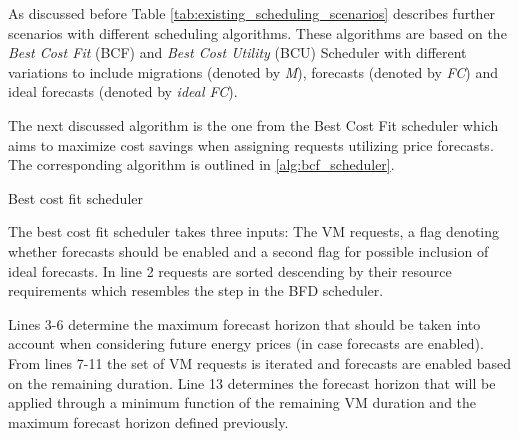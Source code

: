 As discussed before Table \ref{tab:existing_scheduling_scenarios} describes further scenarios with different scheduling algorithms. 
These algorithms are based on the \textit{Best Cost Fit} (BCF) and \textit{Best Cost Utility} (BCU) Scheduler with different variations to include migrations (denoted by \textit{M}), forecasts (denoted by \textit{FC}) and ideal forecasts (denoted by \textit{ideal FC}). 

The next discussed algorithm is the one from the Best Cost Fit scheduler which aims to maximize cost savings when assigning requests utilizing price forecasts. The corresponding algorithm is outlined in \ref{alg:bcf_scheduler}. 

\begin{algorithm}[htpb]
	\SetAlgoLined
\caption{Best cost fit scheduler}
\label{alg:bcf_scheduler}
\end{algorithm}


The best cost fit scheduler takes three inputs: The VM requests, a flag denoting whether forecasts should be enabled and a second flag for possible inclusion of ideal forecasts. In line 2 requests are sorted descending by their resource requirements which resembles the step in the BFD scheduler. 

Lines 3-6 determine the maximum forecast horizon that should be taken into account when considering future energy prices (in case forecasts are enabled). From lines 7-11 the set of VM requests is iterated and forecasts are enabled based on the remaining duration. Line 13 determines the forecast horizon that will be applied through a minimum function of the remaining VM duration and the maximum forecast horizon defined previously. 

